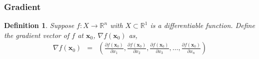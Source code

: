 \documentclass[handout]{beamer}
\newtheorem{thm}{Theorem}
\newtheorem{defn}{Definition}
\numberwithin{equation}{section}
\begin{document}







\begin{frame}
\frametitle{Gradient} 

\begin{defn} 
Suppose $f:X \rightarrow \mathbb{R}^{n}$ with $X \subset \mathbb{R}^{1}$ is a differentiable function.  Define the gradient vector of $f$ at $\boldsymbol{x}_{0}$, $\nabla f(\boldsymbol{x}_{0})$ as, 
\begin{eqnarray}
\nabla f (\boldsymbol{x}_{0})  & = & \left(\frac{\partial f (\boldsymbol{x}_{0}) }{\partial x_{1} }, \frac{\partial f (\boldsymbol{x}_{0}) }{\partial x_{2} }, \frac{\partial f (\boldsymbol{x}_{0}) }{\partial x_{3} }, \hdots, \frac{\partial f (\boldsymbol{x}_{0}) }{\partial x_{n} } \right) \nonumber 
\end{eqnarray}

\end{defn}



\end{frame}
\end{document}
